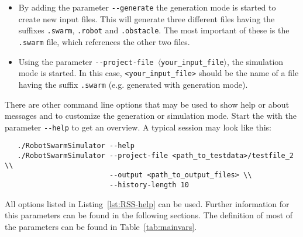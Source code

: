 \documentclass[a4paper,halfparskip,11pt,twoside]{scrartcl}
\begin{document}
\begin{itemize}
	\item By adding the parameter {\tt -{}-generate} the generation mode is started to create new input files. This will generate three different files having the suffixes {\tt .swarm}, {\tt .robot} and {\tt .obstacle}. The most important of these is the {\tt .swarm} file, which references the other two files.
	\item Using the parameter {\tt -{}-project-file $\langle$your\_input\_file$\rangle$}, the simulation mode is started. In this case, \texttt{<your\_input\_file>} should be the name of a file having the suffix {\tt .swarm} (e.g. generated with generation mode).
\end{itemize}

There are other command line options that may be used to show help or about messages and to customize the generation or simulation mode. Start the \RSS with the parameter {\tt -{}-help} to get an overview. A typical session may look like this:

\begin{verbatim}
   ./RobotSwarmSimulator --help
   ./RobotSwarmSimulator --project-file <path_to_testdata>/testfile_2 \\
                         --output <path_to_output_files> \\
                         --history-length 10
\end{verbatim}

All options listed in Listing~\ref{lst:RSS-help} can be used. Further information for this parameters can be found in the following sections. The definition of most of the parameters can be found in Table~\ref{tab:mainvars}.
\end{document}
